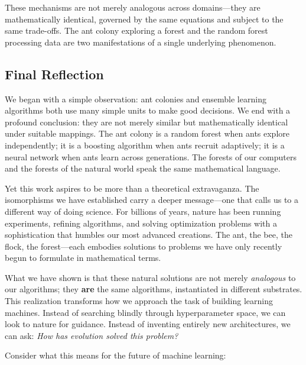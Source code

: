 \documentclass[12pt,letterpaper]{article}
\begin{document}
These mechanisms are not merely analogous across domains—they are mathematically identical, governed by the same equations and subject to the same trade-offs. The ant colony exploring a forest and the random forest processing data are two manifestations of a single underlying phenomenon.

\subsection{Final Reflection}

We began with a simple observation: ant colonies and ensemble learning algorithms both use many simple units to make good decisions. We end with a profound conclusion: they are not merely similar but mathematically identical under suitable mappings. The ant colony is a random forest when ants explore independently; it is a boosting algorithm when ants recruit adaptively; it is a neural network when ants learn across generations. The forests of our computers and the forests of the natural world speak the same mathematical language.

Yet this work aspires to be more than a theoretical extravaganza. The isomorphisms we have established carry a deeper message—one that calls us to a different way of doing science. For billions of years, nature has been running experiments, refining algorithms, and solving optimization problems with a sophistication that humbles our most advanced creations. The ant, the bee, the flock, the forest—each embodies solutions to problems we have only recently begun to formulate in mathematical terms.

What we have shown is that these natural solutions are not merely \emph{analogous} to our algorithms; they \textbf{are} the same algorithms, instantiated in different substrates. This realization transforms how we approach the task of building learning machines. Instead of searching blindly through hyperparameter space, we can look to nature for guidance. Instead of inventing entirely new architectures, we can ask: \emph{How has evolution solved this problem?}

Consider what this means for the future of machine learning:
\end{document}
